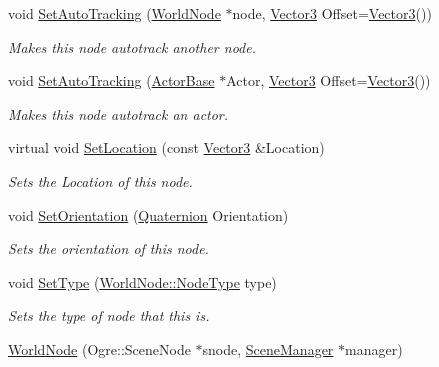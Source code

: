 \begin{DoxyCompactItemize}
void \hyperlink{classphys_1_1WorldNode_a3c8447cd6de0af06a6004cdd968671f0}{SetAutoTracking} (\hyperlink{classphys_1_1WorldNode}{WorldNode} $\ast$node, \hyperlink{classphys_1_1Vector3}{Vector3} Offset=\hyperlink{classphys_1_1Vector3}{Vector3}())
\begin{DoxyCompactList}\small\item\em Makes this node autotrack another node. \item\end{DoxyCompactList}\item 
void \hyperlink{classphys_1_1WorldNode_a3bd06b9d4a4baa6937a8a3a33a33b047}{SetAutoTracking} (\hyperlink{classphys_1_1ActorBase}{ActorBase} $\ast$Actor, \hyperlink{classphys_1_1Vector3}{Vector3} Offset=\hyperlink{classphys_1_1Vector3}{Vector3}())
\begin{DoxyCompactList}\small\item\em Makes this node autotrack an actor. \item\end{DoxyCompactList}\item 
virtual void \hyperlink{classphys_1_1WorldNode_af276da0d87f4ddc1405bc87b9e2e034d}{SetLocation} (const \hyperlink{classphys_1_1Vector3}{Vector3} \&Location)
\begin{DoxyCompactList}\small\item\em Sets the Location of this node. \item\end{DoxyCompactList}\item 
void \hyperlink{classphys_1_1WorldNode_a583cbdca344ac23894ef469c7b7f6062}{SetOrientation} (\hyperlink{classphys_1_1Quaternion}{Quaternion} Orientation)
\begin{DoxyCompactList}\small\item\em Sets the orientation of this node. \item\end{DoxyCompactList}\item 
void \hyperlink{classphys_1_1WorldNode_abc4cf216177c0a3f4397c83fe3b58e75}{SetType} (\hyperlink{classphys_1_1WorldNode_a0b178b06aa411b00c4c2ccd926d9bf5a}{WorldNode::NodeType} type)
\begin{DoxyCompactList}\small\item\em Sets the type of node that this is. \item\end{DoxyCompactList}\item 
\hyperlink{classphys_1_1WorldNode_ae813a2aa737980824725b1909372484e}{WorldNode} (Ogre::SceneNode $\ast$snode, \hyperlink{classphys_1_1SceneManager}{SceneManager} $\ast$manager)

\end{DoxyCompactItemize}
